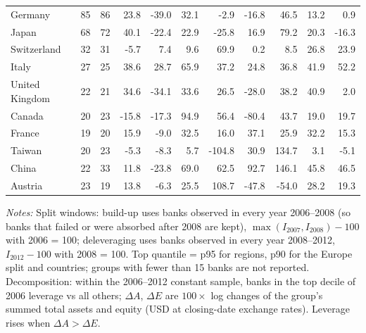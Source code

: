 \begin{table}[htbp]
\begin{threeparttable}
\begin{tabular}{lrrrrrrrrrr}
Germany & 85 & 86 & 23.8 & -39.0 & 32.1 & -2.9 & -16.8 & 46.5 & 13.2 & 0.9 \\
Japan & 68 & 72 & 40.1 & -22.4 & 22.9 & -25.8 & 16.9 & 79.2 & 20.3 & -16.3 \\
Switzerland & 32 & 31 & -5.7 & 7.4 & 9.6 & 69.9 & 0.2 & 8.5 & 26.8 & 23.9 \\
Italy & 27 & 25 & 38.6 & 28.7 & 65.9 & 37.2 & 24.8 & 36.8 & 41.9 & 52.2 \\
United Kingdom & 22 & 21 & 34.6 & -34.1 & 33.6 & 26.5 & -28.0 & 38.2 & 40.9 & 2.0 \\
Canada & 20 & 23 & -15.8 & -17.3 & 94.9 & 56.4 & -80.4 & 43.7 & 19.0 & 19.7 \\
France & 19 & 20 & 15.9 & -9.0 & 32.5 & 16.0 & 37.1 & 25.9 & 32.2 & 15.3 \\
Taiwan & 20 & 23 & -5.3 & -8.3 & 5.7 & -104.8 & 30.9 & 134.7 & 3.1 & -5.1 \\
China & 22 & 33 & 11.8 & -23.8 & 69.0 & 62.5 & 92.7 & 146.1 & 45.8 & 46.5 \\
Austria & 23 & 19 & 13.8 & -6.3 & 25.5 & 108.7 & -47.8 & -54.0 & 28.2 & 19.3 \\
\bottomrule
\end{tabular}
\begin{tablenotes}[flushleft]
\footnotesize
\item \textit{Notes:} Split windows: build-up uses banks observed in every year 2006--2008 (so banks that failed or were absorbed after 2008 are kept), $\max(I_{2007}, I_{2008}) - 100$ with 2006 = 100; deleveraging uses banks observed in every year 2008--2012, $I_{2012} - 100$ with 2008 = 100. Top quantile = p95 for regions, p90 for the Europe split and countries; groups with fewer than 15 banks are not reported. Decomposition: within the 2006--2012 constant sample, banks in the top decile of 2006 leverage vs all others; $\Delta A$, $\Delta E$ are $100\times$ log changes of the group's summed total assets and equity (USD at closing-date exchange rates). Leverage rises when $\Delta A > \Delta E$.
\end{tablenotes}
\end{threeparttable}
\end{table}
